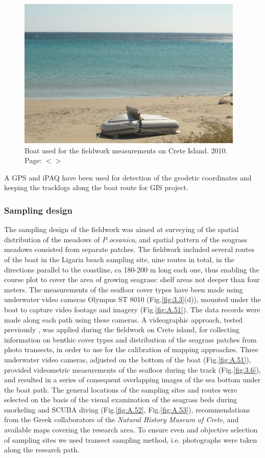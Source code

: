 \documentclass[11pt]{article}
\begin{document}
\begin{figure}[H]
	\centering
	\includegraphics[scale=0.60]{Fig-18.jpg}
	\caption{Boat used for the fieldwork measurements on Crete Island. 2010. Page: $<$\pageref{page-24}$>$}
	\label{fig:3.4}
\end{figure}

A \ac{GPS} and \ac{iPAQ} have been used for detection of the geodetic coordinates and keeping the tracklogs
along the boat route for \ac{GIS} project.

\subsubsection{Sampling design}\label{page-25}
The sampling design of the fieldwork was aimed at surveying of the spatial distribution of the
meadows of \textit{P.oceanica}, and spatial pattern of the seagrass meadows consisted from separate
patches. The fieldwork included several routes of the boat in the Ligaria beach sampling site, nine
routes in total, in the directions parallel to the coastline, ca 180-200 m long each one, thus enabling the
course plot to cover the area of growing seagrass: shelf areas not deeper than four meters.
The measurements of the seafloor cover types have been made using underwater video cameras
Olympus ST 8010 (Fig.\ref{fig:3.3}(d)), mounted under the boat to capture video footage and imagery (Fig.\ref{fig:A.51}). The data records
were made along each path using these cameras. A videographic approach, tested previously \cite{Norris97}\label{Norris97},
 was applied during the fieldwork on Crete island, for collecting information on benthic cover types and
distribution of the seagrass patches from photo transects, in order to use for the calibration of mapping approaches.
Three underwater video cameras, adjusted on the bottom of the boat (Fig.\ref{fig:A.51}), provided videometric measurements of the
seafloor during the track (Fig.\ref{fig:3.6}), and resulted in a series of consequent overlapping images of the sea bottom under the
boat path. The general locations of the sampling sites and routes were selected on the basis of the visual examination
of the seagrass beds during snorkeling and \ac{SCUBA} diving (Fig.\ref{fig:A.52}, Fig.\ref{fig:A.53}), recommendations from the Greek collaborators of the \textit{Natural History Museum of Crete}, and available maps covering the research area. To ensure even and objective selection of sampling sites
we used transect sampling method, i.e. photographs were taken along the research path. 
\end{document}
